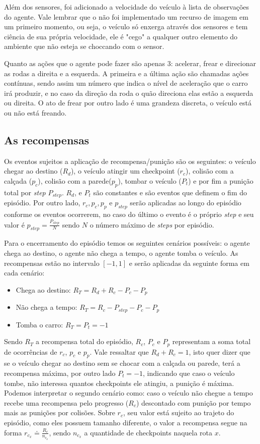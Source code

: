  Além dos sensores, foi adicionado a velocidade do veículo à lista de observações do agente. Vale lembrar que o não foi implementado um recurso de imagem em um primeiro momento, ou seja, o veículo só enxerga através dos sensores e tem ciência de sua própria velocidade, ele é "cego"{} a qualquer outro elemento do ambiente que não esteja se choccando com o sensor.

 Quanto as ações que o agente pode fazer são apenas 3: acelerar, frear e direcionar as rodas a direita e a esquerda. A primeira e a última ação são chamadas ações contínuas, sendo assim um número que indica o nível de aceleração que o carro irá produzir, e no caso da direção da roda o quão direciona elas estão a esquerda ou direita. O ato de frear por outro lado é uma grandeza discreta, o veículo está ou não está freando.

\subsection{As recompensas}
Os eventos sujeitos a aplicação de recompensa/punição são os seguintes: o veículo chegar ao destino ($R_d$), o veículo atingir um checkpoint ($r_c$), colisão com a calçada ($p_c$), colisão com a parede($p_p$), tombar o veículo ($P_t$) e por fim a punição total por \textit{step} $P_{step}$. $R_d$, e $P_t$ são constantes e são eventos que definem o fim do episódio. Por outro lado, $r_c, p_c, p_p \text{ e } p_{step}$ serão aplicadas ao longo do episódio conforme os eventos ocorrerem, no caso do último o evento é o próprio \textit{step} e seu valor é $p_{step} = \frac{P_{step}}{N}$ sendo $N$ o número máximo de \textit{steps} por episódio.

Para o encerramento do episódio temos os seguintes cenários possíveis: o agente chega ao destino, o agente não chega a tempo, o agente tomba o veículo. As recompensas estão no intervalo $[-1,1]$ e serão aplicadas da seguinte forma em cada cenário:

\begin{itemize}
   \item Chega ao destino: $R_T = R_d + R_c - P_c - P_p$
   \item Não chega a tempo: $R_T = R_c - P_{step} - P_c - P_p$
   \item Tomba o carro: $R_T = P_t = -1$
\end{itemize}

Sendo $R_T$ a recompensa total do episódio, $R_c$, $P_c$ e $P_p$ representam a soma total de ocorrências de $r_c$, $p_c$ e $p_p$. Vale ressaltar que $R_d + R_c = 1$, isto quer dizer que se o veículo chegar ao destino sem se chocar com a calçada ou parede, terá a recompensa máxima, por outro lado $P_t = -1$, indicando que caso o veículo tombe, não interessa quantos checkpoints ele atingiu, a punição é máxima. Podemos interpretar o segundo cenário como: caso o veículo não chegue a tempo recebe uma recompensa pelo progresso ($R_c$) descontado com punição por tempo mais as punições por colisões. Sobre $r_c$, seu valor está sujeito ao trajeto do episódio, como eles possuem tamanho diferente, o valor a recompensa segue na forma $r_{c_x} \doteq \frac{R_c}{n_{c_x}}$, sendo $n_{c_x}$ a quantidade de checkpoints naquela rota $x$.


